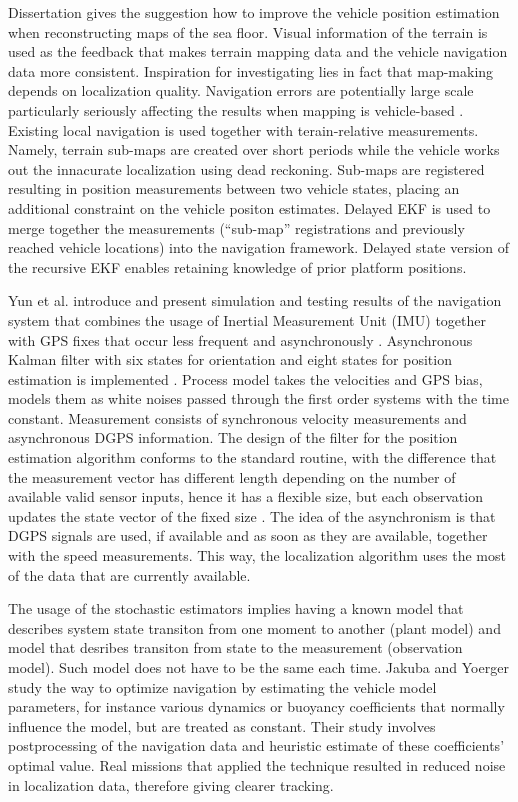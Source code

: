 Dissertation \cite{roman05} gives the suggestion how to improve the vehicle position estimation when reconstructing maps of the sea floor. Visual information of the terrain is used as the feedback that makes terrain mapping data and the vehicle navigation data more consistent. Inspiration for investigating lies in fact that map-making depends on localization quality. Navigation errors are potentially large scale particularly seriously affecting the results when mapping is vehicle-based \cite{roman05}. Existing local navigation is used together with terain-relative measurements. Namely, terrain sub-maps are created over short periods while the vehicle works out the innacurate localization using dead reckoning. Sub-maps are registered resulting in position measurements between two vehicle states, placing an additional constraint on the vehicle positon estimates. Delayed EKF is used to merge together the measurements (``sub-map'' registrations and previously reached vehicle locations) into the navigation framework. Delayed state version of the recursive EKF enables retaining knowledge of prior platform positions.  

Yun et al. introduce and present simulation and testing results of the navigation system that combines the usage of Inertial Measurement Unit (IMU) together with GPS fixes that occur less frequent and asynchronously \cite{yun00}. Asynchronous Kalman filter with six states for orientation and eight states for position estimation is implemented \cite{yun00}. Process model takes the velocities and GPS bias, models them as white noises passed through the first order systems with the time constant. Measurement consists of synchronous velocity measurements and asynchronous DGPS information. The design of the filter for the position estimation algorithm conforms to the standard routine, with the difference that the measurement vector has different length depending on the number of available valid sensor inputs, hence it has a flexible size, but each observation updates the state vector of the fixed size \cite{yun00}. The idea of the asynchronism is that DGPS signals are used, if available and as soon as they are available, together with the speed measurements. This way, the localization algorithm uses the most of the data that are currently available.

The usage of the stochastic estimators implies having a known model that describes system state transiton from one moment to another (plant model) and model that desribes transiton from state to the measurement (observation model). Such model does not have to be the same each time. Jakuba and Yoerger \cite{jakuba03} study the way to optimize navigation by estimating the vehicle model parameters, for instance various dynamics or buoyancy coefficients that normally influence the model, but are treated as constant. Their study involves postprocessing of the navigation data and heuristic estimate of these coefficients' optimal value. Real missions that applied the technique resulted in reduced noise in localization data, therefore giving clearer tracking. 

